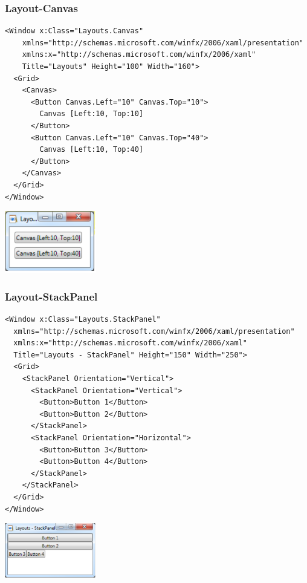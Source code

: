 \subsubsection{Layout-Canvas}
\begin{minipage}{14cm}

\begin{lstlisting}[style=CSharp]
<Window x:Class="Layouts.Canvas"
    xmlns="http://schemas.microsoft.com/winfx/2006/xaml/presentation"
    xmlns:x="http://schemas.microsoft.com/winfx/2006/xaml"
    Title="Layouts" Height="100" Width="160">
  <Grid>
    <Canvas>
      <Button Canvas.Left="10" Canvas.Top="10">
        Canvas [Left:10, Top:10]
      </Button>
      <Button Canvas.Left="10" Canvas.Top="40">
        Canvas [Left:10, Top:40]
      </Button>
    </Canvas>
  </Grid>
</Window>
\end{lstlisting}


\end{minipage}
\begin{minipage}{4cm}
  \includegraphics[width=4cm]{images/XAML/canvas}
\end{minipage}


\subsubsection{Layout-StackPanel}
\begin{minipage}{14cm}
\begin{lstlisting}[style=CSharp]
<Window x:Class="Layouts.StackPanel"
  xmlns="http://schemas.microsoft.com/winfx/2006/xaml/presentation"
  xmlns:x="http://schemas.microsoft.com/winfx/2006/xaml"
  Title="Layouts - StackPanel" Height="150" Width="250">
  <Grid>
    <StackPanel Orientation="Vertical">
      <StackPanel Orientation="Vertical">
        <Button>Button 1</Button>
        <Button>Button 2</Button>
      </StackPanel>
      <StackPanel Orientation="Horizontal">
        <Button>Button 3</Button>
        <Button>Button 4</Button>
      </StackPanel>
    </StackPanel>
  </Grid>
</Window>
\end{lstlisting}
\end{minipage}
\begin{minipage}{4cm}
  \includegraphics[width=4cm]{images/XAML/StackPanel}
\end{minipage}

